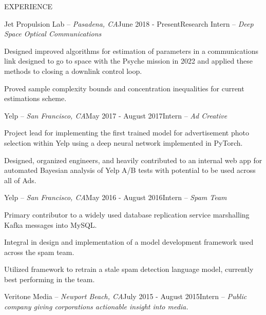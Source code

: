 \documentclass{resume} %
\begin{document}
 

\vspace{-1em}
\begin{rSection}{EXPERIENCE}

\begin{rSubsection}{Jet Propulsion Lab -- {\it Pasadena, CA}}{June 2018 - Present}{Research Intern -- {\sl Deep Space Optical Communications}}

\item Designed improved algorithms for estimation of parameters in a communications link designed
    to go to space with the Psyche mission in 2022 and applied these methods to closing a downlink
    control loop.
\item Proved sample complexity bounds and concentration inequalities for current estimations scheme.
\end{rSubsection}

\begin{rSubsection}{Yelp -- {\it San Francisco, CA}}{May 2017 - August 2017}{Intern -- {\sl Ad Creative}}

\item Project lead for implementing the first trained model for advertisement photo selection
    within Yelp using a deep neural network implemented in PyTorch.
\item Designed, organized engineers, and heavily contributed to an internal web app for
    automated Bayesian analysis of Yelp A/B tests with potential to be used across all of Ads.
\end{rSubsection}

\begin{rSubsection}{Yelp -- {\it San Francisco, CA}}{May 2016 - August 2016}{Intern -- {\sl Spam Team}}

\item Primary contributor to a widely used database replication service marshalling Kafka messages into MySQL.
\item Integral in design and implementation of a model development framework used across the spam team.
\item Utilized framework to retrain a stale spam detection language model, currently best performing in
    the team.
\end{rSubsection}

\begin{rSubsection}{Veritone Media -- {\it Newport Beach, CA}}{July 2015 - August 2015}{Intern -- {\sl Public company giving corporations actionable insight into media.}}


\end{rSubsection}
\end{rSection}
\end{document}
